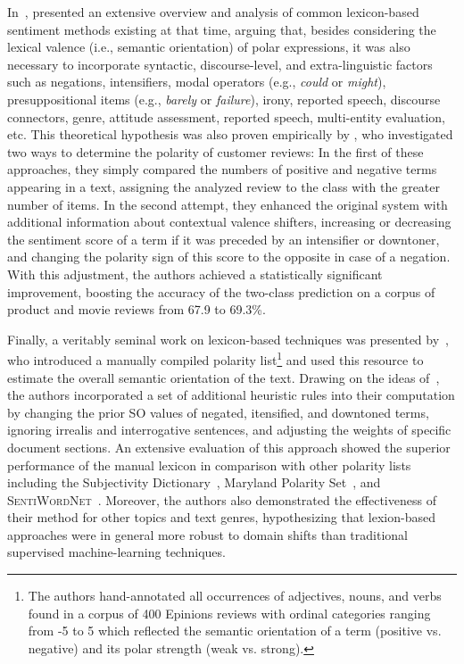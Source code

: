 In~\citeyear{Polanyi:06}, \citeauthor{Polanyi:06} presented an
extensive overview and analysis of common lexicon-based sentiment
methods existing at that time, arguing that, besides considering the
lexical valence (i.e., semantic orientation) of polar expressions, it
was also necessary to incorporate syntactic, discourse-level, and
extra-linguistic factors such as negations, intensifiers, modal
operators (e.g., \emph{could} or \emph{might}), presuppositional items
(e.g., \emph{barely} or \emph{failure}), irony, reported speech,
discourse connectors, genre, attitude assessment, reported speech,
multi-entity evaluation, etc.  This theoretical hypothesis was also
proven empirically by \citet{Kennedy:06}, who investigated two ways to
determine the polarity of customer reviews: In the first of these
approaches, they simply compared the numbers of positive and negative
terms appearing in a text, assigning the analyzed review to the class
with the greater number of items.  In the second attempt, they
enhanced the original system with additional information about
contextual valence shifters, increasing or decreasing the sentiment
score of a term if it was preceded by an intensifier or downtoner, and
changing the polarity sign of this score to the opposite in case of a
negation.  With this adjustment, the authors achieved a statistically
significant improvement, boosting the accuracy of the two-class
prediction on a corpus of product and movie reviews from 67.9 to
69.3\%.

Finally, a veritably seminal work on lexicon-based techniques was
presented by~\citet{Taboada:11}, who introduced a manually compiled
polarity list\footnote{The authors hand-annotated all occurrences of
  adjectives, nouns, and verbs found in a corpus of 400 Epinions
  reviews with ordinal categories ranging from -5 to 5 which reflected
  the semantic orientation of a term (positive vs. negative) and its
  polar strength (weak vs. strong).} and used this resource to
estimate the overall semantic orientation of the text.  Drawing on the
ideas of~\citet{Polanyi:06}, the authors incorporated a set of
additional heuristic rules into their computation by changing the
prior SO values of negated, itensified, and downtoned terms, ignoring
irrealis and interrogative sentences, and adjusting the weights of
specific document sections.  An extensive evaluation of this approach
showed the superior performance of the manual lexicon in comparison
with other polarity lists including the Subjectivity
Dictionary~\cite{Wilson:05}, Maryland Polarity Set~\cite{Mohammad:09},
and \textsc{SentiWordNet}~\cite{Esuli:06c}.  Moreover, the authors
also demonstrated the effectiveness of their method for other topics
and text genres, hypothesizing that lexion-based approaches were in
general more robust to domain shifts than traditional supervised
machine-learning techniques.

